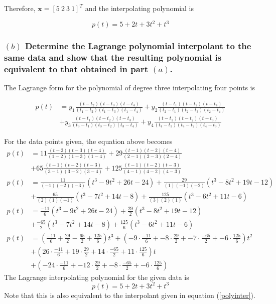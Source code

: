 Therefore, $\mathbf{x} = \left[5\:2\:3\:1\right]^T$ and the interpolating polynomial is

\begin{equation}\label{polyinter}
\boxed{p(t) = 5+2t+3t^2+t^3}
\end{equation}

\subsubsection*{$(b)$ Determine the Lagrange polynomial interpolant to the same data and show that the resulting polynomial is equivalent to that obtained in part $(a)$.}

The Lagrange form for the polynomial of degree three interpolating four points is

\begin{align*}
p(t) &= y_1\frac{(t-t_2)(t-t_3)(t-t_4)}{(t_1-t_2)(t_1-t_3)(t_1-t_4)} + y_2\frac{(t-t_1)(t-t_2)(t-t_4)}{(t_2-t_1)(t_2-t_3)(t_2-t_4)} \\
&+ y_3\frac{(t-t_1)(t-t_2)(t-t_3)}{(t_3-t_1)(t_3-t_2)(t_3-t_4)} + y_4\frac{(t-t_1)(t-t_2)(t-t_3)}{(t_4-t_1)(t_4-t_2)(t_4-t_3)}
\end{align*}

For the data points given, the equation above becomes
\begin{align*}
p(t) &= 11\frac{(t-2)(t-3)(t-4)}{(1-2)(1-3)(1-4)} + 29\frac{(t-1)(t-2)(t-4)}{(2-1)(2-3)(2-4)} \\
&+ 65\frac{(t-1)(t-2)(t-3)}{(3-1)(3-2)(3-4)} + 125\frac{(t-1)(t-2)(t-3)}{(4-1)(4-2)(4-3)} \\
p(t) &= \frac{11}{(-1)(-2)(-3)}\left(t^3-9t^2+26t-24\right) + \frac{29}{(1)(-1)(-2)}\left(t^3-8t^2+19t-12\right) \\
&+ \frac{65}{(2)(1)(-1)}\left(t^3-7t^2+14t-8\right) + \frac{125}{(3)(2)(1)}\left(t^3-6t^2+11t-6\right) \\p(t) &= \frac{-11}{6}\left(t^3-9t^2+26t-24\right) + \frac{29}{2}\left(t^3-8t^2+19t-12\right) \\
&+ \frac{-65}{2}\left(t^3-7t^2+14t-8\right) + \frac{125}{6}\left(t^3-6t^2+11t-6\right) \\
p(t) &= \left(\frac{-11}{6}+\frac{29}{2}-\frac{65}{2}+\frac{125}{6}\right)t^3 + \left(-9\cdot\frac{-11}{6}+-8\cdot\frac{29}{2}+-7\cdot\frac{-65}{2}+-6\cdot\frac{125}{6}\right)t^2 \\
&+ \left(26\cdot\frac{-11}{6}+19\cdot\frac{29}{2}+14\cdot\frac{-65}{2}+11\cdot\frac{125}{6}\right)t\\&+\left(-24\cdot\frac{-11}{6}+-12\cdot\frac{29}{2}+-8\cdot\frac{-65}{2}+-6\cdot\frac{125}{6}\right)
\end{align*}
The Lagrange interpolating polynomial for the given data is
\begin{equation}\label{polyinter2}
\boxed{p(t) = 5+2t+3t^2+t^3}
\end{equation}
Note that this is also equivalent to the interpolant given in equation (\ref{polyinter}).

